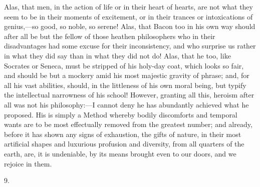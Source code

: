 Alas, that men, in the action of life or in their heart of hearts,
are not what they seem to be in their moments of excitement, or in
their trances or intoxications of genius,—so good, so noble, so
serene! Alas, that Bacon too in his own way should after all be but
the fellow of those heathen philosophers who in their disadvantages
had some excuse for their inconsistency, and who surprise us rather in
what they did say than in what they did not do! Alas, that he too,
like Socrates or Seneca, must be stripped of his holy-day coat, which
looks so fair, and should be but a mockery amid his most majestic
gravity of phrase; and, for all his vast abilities, should, in the
littleness of his own moral being, but typify the intellectual
narrowness of his school! However, granting all this, heroism after
all was not his philosophy:—I cannot deny he has abundantly achieved
what he proposed. His is simply a Method whereby bodily discomforts
and temporal wants are to be most effectually removed from the
greatest number; and already, before it has shown any signs of
exhaustion, the gifts of nature, in their most artificial shapes and
luxurious profusion and diversity, from all quarters of the earth,
are, it is undeniable, by its means brought even to our doors, and we rejoice in them.

9.

